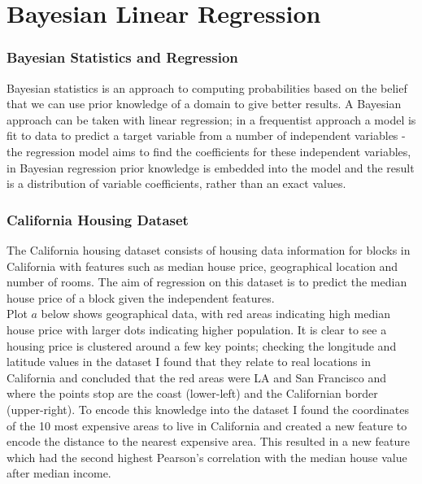 \documentclass[11pt]{article}
\begin{document}
\newpage


\section{Bayesian Linear Regression}
\label{bayesian_linear_regression}

\subsubsection{Bayesian Statistics and Regression}

Bayesian statistics is an approach to computing probabilities based on the belief that we can use prior knowledge of a domain to give better results. A Bayesian approach can be taken with linear regression; in a frequentist approach a model is fit to data to predict a target variable from a number of independent variables - the regression model aims to find the coefficients for these independent variables, in Bayesian regression prior knowledge is embedded into the model and the result is a distribution of variable coefficients, rather than an exact values.

\subsubsection{California Housing Dataset}

The California housing dataset consists of housing data information for blocks in California with features such as median house price, geographical location and number of rooms. The aim of regression on this dataset is to predict the median house price of a block given the independent features. \\

Plot $a$ below shows geographical data, with red areas indicating high median house price with larger dots indicating higher population. It is clear to see a housing price is clustered around a few key points; checking the longitude and latitude values in the dataset I found that they relate to real locations in California and concluded that the red areas were LA and San Francisco and where the points stop are the coast (lower-left) and the Californian border (upper-right). To encode this knowledge into the dataset I found the coordinates of the 10 most expensive areas to live in California and created a new feature to encode the distance to the nearest expensive area. This resulted in a new feature which had the second highest Pearson's correlation with the median house value after median income. \\
\end{document}
